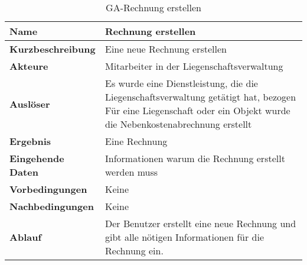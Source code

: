 \begin{table}[H]
  \centering
  \settowidth{}
  \setlength\extrarowheight{2pt}
  \begin{tabulary}{1.0\textwidth}{|a|m{12cm}|}
    \hline
    \textbf{Name}&Rechnung erstellen\\
    \hline 
    \textbf{Kurzbeschreibung} & Eine neue Rechnung erstellen\\
    \hline
    \textbf{Akteure} & Mitarbeiter in der Liegenschaftsverwaltung\\
    \hline
    \textbf{Auslöser} & Es wurde eine Dienstleistung, die die Liegenschaftsverwaltung getätigt hat, bezogen \newline 
    Für eine Liegenschaft oder ein Objekt wurde die Nebenkostenabrechnung erstellt\\
    \hline
    \textbf{Ergebnis} & Eine Rechnung\\
    \hline
    \textbf{Eingehende Daten} & Informationen warum die Rechnung erstellt werden muss \\
    \hline
    \textbf{Vorbedingungen} & Keine\\
    \hline
    \textbf{Nachbedingungen} & Keine\\
    \hline
    \textbf{Ablauf} & Der Benutzer erstellt eine neue Rechnung und gibt alle nötigen Informationen für die Rechnung ein.\\
    \hline
  \end{tabulary}
  \caption{GA-Rechnung erstellen}
\end{table}